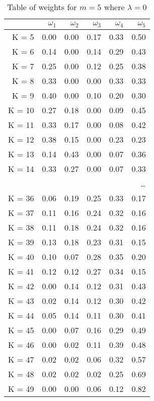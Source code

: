 \documentclass[a4paper,11pt]{article}
\begin{document}
\begin{table}[hh]
	\caption{Table of weights for $m=5$ where $\lambda = 0$}
	\centering
	\begin{tabular}{rrrrrr}
		\hline
		& $\omega_1$ &  $\omega_2$ &  $\omega_3$ &  $\omega_4$ &  $\omega_5$ \\
		\hline
		K = 5 & 0.00 & 0.00 & 0.17 & 0.33 & 0.50 \\ 
		K = 6 & 0.14 & 0.00 & 0.14 & 0.29 & 0.43 \\ 
		K = 7 & 0.25 & 0.00 & 0.12 & 0.25 & 0.38 \\ 
		K = 8 & 0.33 & 0.00 & 0.00 & 0.33 & 0.33 \\ 
		K = 9 & 0.40 & 0.00 & 0.10 & 0.20 & 0.30 \\ 
		K = 10 & 0.27 & 0.18 & 0.00 & 0.09 & 0.45 \\ 
		K = 11 & 0.33 & 0.17 & 0.00 & 0.08 & 0.42 \\ 
		K = 12 & 0.38 & 0.15 & 0.00 & 0.23 & 0.23 \\ 
		K = 13 & 0.14 & 0.43 & 0.00 & 0.07 & 0.36 \\ 
		K = 14 & 0.33 & 0.27 & 0.00 & 0.07 & 0.33 \\ 
		&&&&&\dots\\
		K = 36 & 0.06 & 0.19 & 0.25 & 0.33 & 0.17 \\ 
		K = 37 & 0.11 & 0.16 & 0.24 & 0.32 & 0.16 \\ 
		K = 38 & 0.11 & 0.18 & 0.24 & 0.32 & 0.16 \\ 
		K = 39 & 0.13 & 0.18 & 0.23 & 0.31 & 0.15 \\ 
		K = 40 & 0.10 & 0.07 & 0.28 & 0.35 & 0.20 \\ 
		K = 41 & 0.12 & 0.12 & 0.27 & 0.34 & 0.15 \\ 
		K = 42 & 0.00 & 0.14 & 0.12 & 0.31 & 0.43 \\ 
		K = 43 & 0.02 & 0.14 & 0.12 & 0.30 & 0.42 \\ 
		K = 44 & 0.05 & 0.14 & 0.11 & 0.30 & 0.41 \\ 
		K = 45 & 0.00 & 0.07 & 0.16 & 0.29 & 0.49 \\ 
		K = 46 & 0.00 & 0.02 & 0.11 & 0.39 & 0.48 \\ 
		K = 47 & 0.02 & 0.02 & 0.06 & 0.32 & 0.57 \\ 
		K = 48 & 0.02 & 0.02 & 0.02 & 0.25 & 0.69 \\ 
		K = 49 & 0.00 & 0.00 & 0.06 & 0.12 & 0.82 \\ 
		\hline
	\end{tabular}
\end{table}
\end{document}
